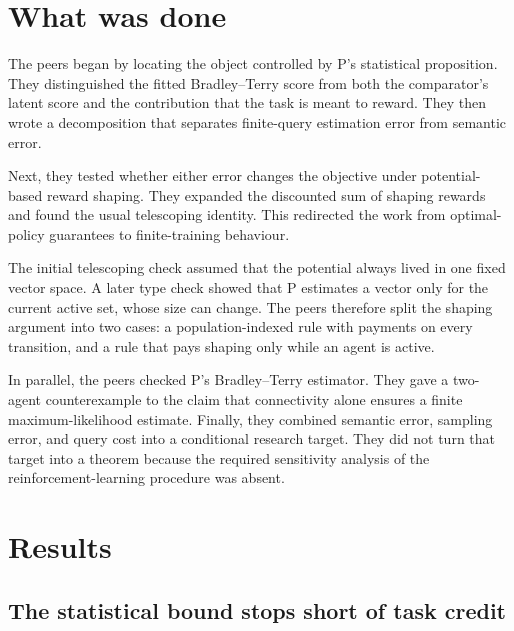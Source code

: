 \documentclass{article}
\begin{document}
\section{What was done}

The peers began by locating the object controlled by P's statistical proposition.  They distinguished the fitted Bradley--Terry score from both the comparator's latent score and the contribution that the task is meant to reward.  They then wrote a decomposition that separates finite-query estimation error from semantic error.

Next, they tested whether either error changes the objective under potential-based reward shaping.  They expanded the discounted sum of shaping rewards and found the usual telescoping identity.  This redirected the work from optimal-policy guarantees to finite-training behaviour.

The initial telescoping check assumed that the potential always lived in one fixed vector space.  A later type check showed that P estimates a vector only for the current active set, whose size can change.  The peers therefore split the shaping argument into two cases: a population-indexed rule with payments on every transition, and a rule that pays shaping only while an agent is active.

In parallel, the peers checked P's Bradley--Terry estimator.  They gave a two-agent counterexample to the claim that connectivity alone ensures a finite maximum-likelihood estimate.  Finally, they combined semantic error, sampling error, and query cost into a conditional research target.  They did not turn that target into a theorem because the required sensitivity analysis of the reinforcement-learning procedure was absent.

\section{Results}

\subsection{The statistical bound stops short of task credit}
\end{document}
